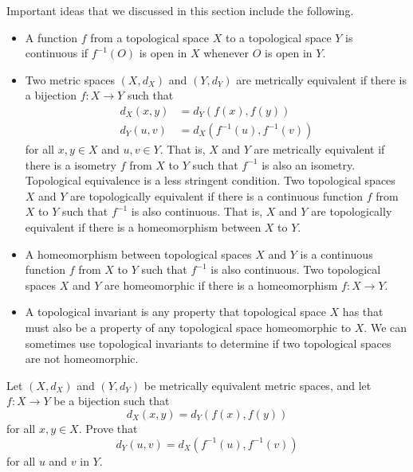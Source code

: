 Important ideas that we discussed in this section include the following.
\begin{itemize}
\item A function $f$ from a topological space $X$ to a topological space $Y$ is continuous if $f^{-1}(O)$ is open in $X$ whenever $O$ is open in $Y$. 
\item Two metric spaces $(X,d_X)$ and $(Y,d_Y)$ are metrically equivalent if there is a bijection $f : X \to Y$ such that 
\begin{align*}
d_X(x,y) &= d_Y(f(x),f(y)) \\
d_Y(u,v) &= d_X(f^{-1}(u), f^{-1}(v))
\end{align*}
for all $x,y \in X$ and $u,v \in Y$. That is, $X$ and $Y$ are metrically equivalent if there is a isometry $f$ from $X$ to $Y$ such that $f^{-1}$ is also an isometry. Topological equivalence is a less stringent condition. Two topological spaces $X$ and $Y$ are topologically equivalent if there is a continuous function $f$ from $X$ to $Y$ such that $f^{-1}$ is also continuous. That is, $X$ and $Y$ are topologically equivalent if there is a homeomorphism between $X$ to $Y$. 
\item A homeomorphism between topological spaces $X$ and $Y$ is a continuous function $f$ from $X$ to $Y$ such that $f^{-1}$ is also continuous. Two topological spaces $X$ and $Y$ are homeomorphic if there is a homeomorphism $f : X \to Y$. 
\item A topological invariant is any property that topological space $X$ has that must also be a property of any topological space homeomorphic to $X$. We can sometimes use topological invariants to determine if two topological spaces are not homeomorphic.
\end{itemize}


\be

\item \label{ex:isometry_reverse} Let $(X,d_X)$ and $(Y,d_Y)$ be metrically equivalent metric spaces, and let $f:X \to Y$ be a bijection such that 
\[d_X(x,y) = d_Y(f(x),f(y))\]
for all $x,y \in X$. Prove that 
\[d_Y(u,v) = d_X(f^{-1}(u), f^{-1}(v))\]
for all $u$ and $v$ in $Y$. 

\begin{comment}

\ExerciseSolution Let $u,v$ be elements in $Y$. Since $f$ is a bijection, there exist $x$ and $y$ in $X$ such that $f(x) = u$ and $f(y) = b$, or $u = f^{-1}(x)$ and $b = f^{-1}(y)$. Then
\[d_Y(u,v) = d_Y(f(x),f(y)) = d_X(x,y) = d_X(f^{-1}(u), f^{-1}(v)).\]

\end{comment}

